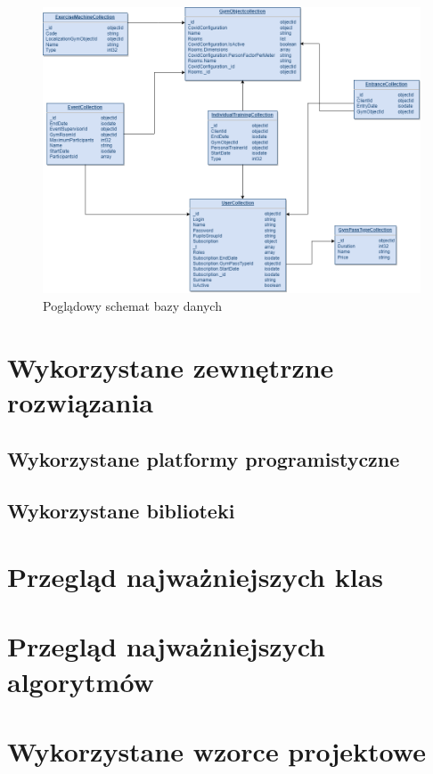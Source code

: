 \documentclass[a4paper,twoside,12pt]{book}
\begin{document}
\begin{figure}[H]
	\centering
	\includegraphics[width=1\linewidth]{../diagramy/schemat_bazy}
	\caption{Poglądowy schemat bazy danych}
	\label{fig:schematbazy}
\end{figure}

\section{Wykorzystane zewnętrzne rozwiązania}
\subsection{Wykorzystane platformy programistyczne}
\subsection{Wykorzystane biblioteki}

\section{Przegląd najważniejszych klas}

\section{Przegląd najważniejszych algorytmów}

\section{Wykorzystane wzorce projektowe}
\end{document}
